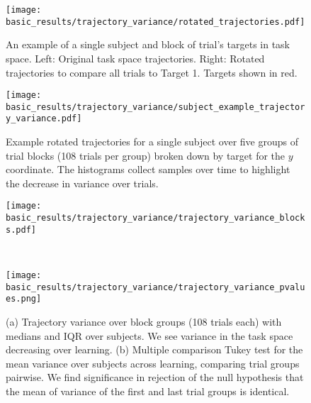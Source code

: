 \documentclass[../main.tex]{subfiles}
\begin{document}
\begin{figure}[!htb]%
    \centering
    \texttt{[image: basic\_results/trajectory\_variance/rotated\_trajectories.pdf]}
    \caption[Example rotated trajectories, single block]{An example of a single subject and block of trial's targets in task space. Left: Original task space trajectories. Right: Rotated trajectories to compare all trials to Target 1. Targets shown in red.}\label{fig:rotated_trajectories}
\end{figure}


\begin{sidewaysfigure}[!htb]
    \centering
    \texttt{[image: basic\_results/trajectory\_variance/subject\_example\_trajectory\_variance.pdf]}
    \caption[Example rotated trajectories, all blocks]{Example rotated trajectories for a single subject over five groups of trial blocks (108 trials per group) broken down by target for the $y$ coordinate. The histograms collect samples over time to highlight the decrease in variance over trials.}\label{fig:example_trajectories}
\end{sidewaysfigure}


\begin{figure}[!htb]%
    \centering
    \begin{minipage}{1.0\textwidth}
    \texttt{[image: basic\_results/trajectory\_variance/trajectory\_variance\_blocks.pdf]}\subcaption{}
    \end{minipage}\\%
    \begin{minipage}{0.7\textwidth}
        \texttt{[image: basic\_results/trajectory\_variance/trajectory\_variance\_pvalues.png]}
      \subcaption{}
    \end{minipage}
    \caption[Median and IQR of trajectory variance over blocks and subjects]{(a) Trajectory variance over block groups (108 trials each) with medians and IQR over subjects. We see variance in the task space decreasing over learning. (b) Multiple comparison Tukey test for the mean variance over subjects across learning, comparing trial groups pairwise. We find significance in rejection of the null hypothesis that the mean of variance of the first and last trial groups is identical.}\label{fig:trajectory_variance}
\end{figure}


\end{document}
